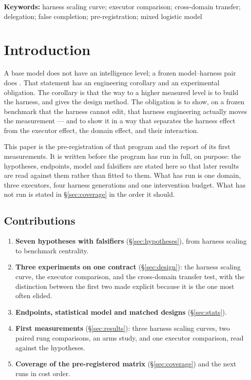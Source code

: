 \noindent\textbf{Keywords:} harness scaling curve; executor comparison; cross-domain transfer; delegation; false completion; pre-registration; mixed logistic model

\tableofcontents
\bigskip

\section{Introduction}\label{sec:intro}

A base model does not have an intelligence level; a frozen model--harness pair does \citep{yang2026unified}. That statement has an engineering corollary and an experimental obligation. The corollary is that the way to a higher measured level is to build the harness, and \citet{yang2026agents} gives the design method. The obligation is to show, on a frozen benchmark that the harness cannot edit, that harness engineering actually moves the measurement --- and to show it in a way that separates the harness effect from the executor effect, the domain effect, and their interaction.

This paper is the pre-registration of that program and the report of its first measurements. It is written before the program has run in full, on purpose: the hypotheses, endpoints, model and falsifiers are stated here so that later results are read against them rather than fitted to them. What has run is one domain, three executors, four harness generations and one intervention budget. What has not run is stated in \S\ref{sec:coverage} in the order it should.

\subsection{Contributions}

\begin{enumerate}[leftmargin=*]
\item \textbf{Seven hypotheses with falsifiers} (\S\ref{sec:hypotheses}), from harness scaling to benchmark centrality.
\item \textbf{Three experiments on one contract} (\S\ref{sec:design}): the harness scaling curve, the executor comparison, and the cross-domain transfer test, with the distinction between the first two made explicit because it is the one most often elided.
\item \textbf{Endpoints, statistical model and matched designs} (\S\ref{sec:stats}).
\item \textbf{First measurements} (\S\ref{sec:results}): three harness scaling curves, two paired rung comparisons, an arms study, and one executor comparison, read against the hypotheses.
\item \textbf{Coverage of the pre-registered matrix} (\S\ref{sec:coverage}) and the next runs in cost order.
\end{enumerate}

